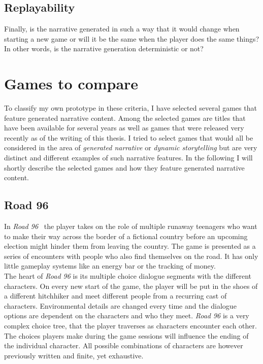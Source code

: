 \subsection{Replayability}
Finally, is the narrative generated in such a way that it would change when starting a new game or will it be the same when the player does the same things? In other words, is the narrative generation deterministic or not?
\section{Games to compare}
To classify my own prototype in these criteria, I have selected several games that feature generated narrative content. Among the selected games are titles that have been available for several years as well as games that were released very recently as of the writing of this thesis. I tried to select games that would all be considered in the area of \textit{generated narrative} or \textit{dynamic storytelling} but are very distinct and different examples of such narrative features. In the following I will shortly describe the selected games and how they feature generated narrative content.
\subsection{Road 96}
In \textit{Road 96}~\cite{road} the player takes on the role of multiple runaway teenagers who want to make their way across the border of a fictional country before an upcoming election might hinder them from leaving the country. The game is presented as a series of encounters with people who also find themselves on the road. It has only little gameplay systems like an energy bar or the tracking of money.\\
The heart of \textit{Road 96} is its multiple choice dialogue segments with the different characters. On every new start of the game, the player will be put in the shoes of a different hitchhiker and meet different people from a recurring cast of characters. Environmental details are changed every time and the dialogue options are dependent on the characters and who they meet. \textit{Road 96} is a very complex choice tree, that the player traverses as characters encounter each other. The choices players make during the game sessions will influence the ending of the individual character. All possible combinations of characters are however previously written and finite, yet exhaustive.
